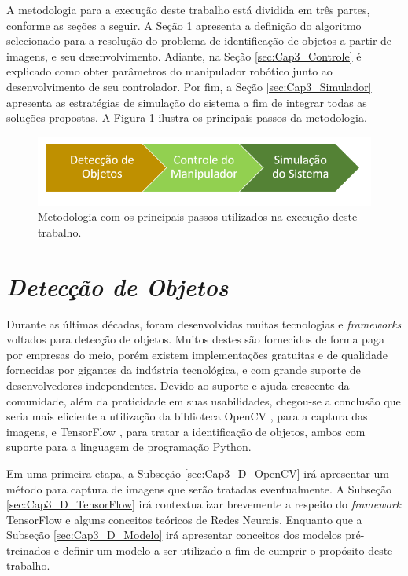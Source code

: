 A metodologia para a execução deste trabalho está dividida em três partes, conforme as seções a seguir. A Seção \ref{sec:Cap3_Deteccao} apresenta a definição do algoritmo selecionado para a resolução do problema de identificação de objetos a partir de imagens, e seu desenvolvimento. Adiante, na Seção \ref{sec:Cap3_Controle} é explicado como obter parâmetros do manipulador robótico junto ao desenvolvimento de seu controlador. Por fim, a Seção \ref{sec:Cap3_Simulador} apresenta as estratégias de simulação do sistema a fim de integrar todas as soluções propostas. A Figura \ref{fig:metodologia} ilustra os principais passos da metodologia.

\begin{figure}[h!]
    \centering
    \includegraphics[width=.75\columnwidth]{Imagens/DiagramaMetodologia.PNG}
    \caption{Metodologia com os principais passos utilizados na execução deste trabalho.}
    \label{fig:metodologia}
\end{figure}

\section{\textit{Detecção de Objetos}}\label{sec:Cap3_Deteccao}

Durante as últimas décadas, foram desenvolvidas muitas tecnologias e \textit{frameworks} voltados para detecção de objetos. Muitos destes são fornecidos de forma paga por empresas do meio, porém existem implementações gratuitas e de qualidade fornecidas por gigantes da indústria tecnológica, e com grande suporte de desenvolvedores independentes. Devido ao suporte e ajuda crescente da comunidade, além da praticidade em suas usabilidades, chegou-se a conclusão que seria mais eficiente a utilização da biblioteca OpenCV \cite{howse2013opencv}, para a captura das imagens, e TensorFlow \cite{tensorFlow}, para tratar a identificação de objetos, ambos com suporte para a linguagem de programação Python.

Em uma primeira etapa, a Subseção \ref{sec:Cap3_D_OpenCV} irá apresentar um método para captura de imagens que serão tratadas eventualmente. A Subseção \ref{sec:Cap3_D_TensorFlow} irá contextualizar brevemente a respeito do \textit{framework} TensorFlow e alguns conceitos teóricos de Redes Neurais. Enquanto que a Subseção \ref{sec:Cap3_D_Modelo} irá apresentar conceitos dos modelos pré-treinados e definir um modelo a ser utilizado a fim de cumprir o propósito deste trabalho.
 
